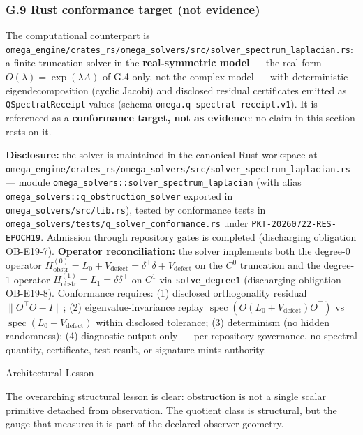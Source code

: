 \documentclass[
  11pt,
]{article}
\begin{document}
\subsubsection{G.9 Rust conformance target (not evidence)}\label{g.9-rust-conformance-target-not-evidence}

The computational counterpart is \texttt{omega\_engine/crates\_rs/omega\_solvers/src/solver\_spectrum\_laplacian.rs}: a finite-truncation solver in the \textbf{real-symmetric model} --- the real form \(O(\lambda)=\exp(\lambda A)\) of G.4 only, not the complex model --- with deterministic eigendecomposition (cyclic Jacobi) and disclosed residual certificates emitted as \texttt{QSpectralReceipt} values (schema \texttt{omega.q-spectral-receipt.v1}). It is referenced as a \textbf{conformance target, not as evidence}: no claim in this section rests on it.

\textbf{Disclosure:} the solver is maintained in the canonical Rust workspace at \texttt{omega\_engine/crates\_rs/omega\_solvers/src/solver\_spectrum\_laplacian.rs} --- module \texttt{omega\_solvers::solver\_spectrum\_laplacian} (with alias \texttt{omega\_solvers::q\_obstruction\_solver} exported in \texttt{omega\_solvers/src/lib.rs}), tested by conformance tests in \texttt{omega\_solvers/tests/q\_solver\_conformance.rs} under \texttt{PKT-20260722-RES-EPOCH19}. Admission through repository gates is completed (discharging obligation OB-E19-7). \textbf{Operator reconciliation:} the solver implements both the degree-0 operator \(H^{(0)}_{\mathrm{obstr}}=L_0+V_{\mathrm{defect}}=\delta^\top\delta+V_{\mathrm{defect}}\) on the \(C^0\) truncation and the degree-1 operator \(H^{(1)}_{\mathrm{obstr}}=L_1=\delta\delta^\top\) on \(C^1\) via \texttt{solve\_degree1} (discharging obligation OB-E19-8). Conformance requires: (1) disclosed orthogonality residual \(\|O^\top O-I\|\); (2) eigenvalue-invariance replay \(\operatorname{spec}(O(L_0+V_{\mathrm{defect}})O^\top)\) vs \(\operatorname{spec}(L_0+V_{\mathrm{defect}})\) within disclosed tolerance; (3) determinism (no hidden randomness); (4) diagnostic output only --- per repository governance, no spectral quantity, certificate, test result, or signature mints authority.

Architectural Lesson

The overarching structural lesson is clear: obstruction is not a single scalar primitive detached from observation. The quotient class is structural, but the gauge that measures it is part of the declared observer geometry.
\end{document}
